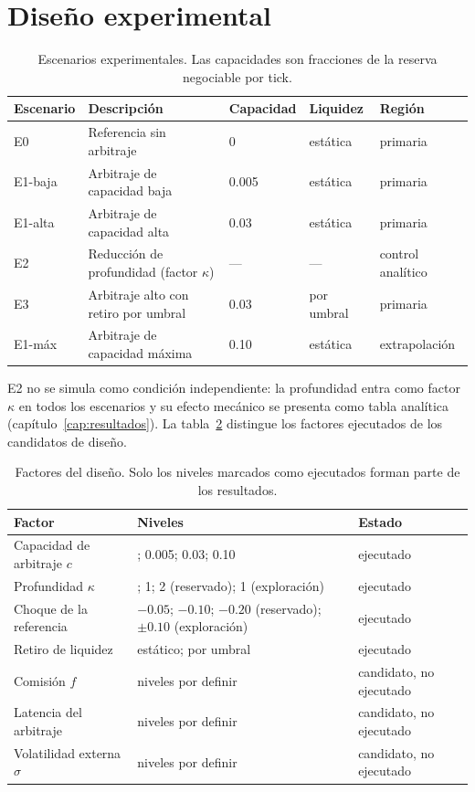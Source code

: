 \section{Diseño experimental}

\begin{table}[htbp]
\centering
\caption{Escenarios experimentales. Las capacidades son fracciones de la reserva negociable por tick.}
\label{tab:escenarios}
\small
\begin{tabularx}{\textwidth}{@{}l >{\raggedright\arraybackslash}X l l l@{}}
\toprule
Escenario & Descripción & Capacidad & Liquidez & Región \\
\midrule
E0 & Referencia sin arbitraje & 0 & estática & primaria \\
E1-baja & Arbitraje de capacidad baja & 0.005 & estática & primaria \\
E1-alta & Arbitraje de capacidad alta & 0.03 & estática & primaria \\
E2 & Reducción de profundidad (factor $\kappa$) & --- & --- & control analítico \\
E3 & Arbitraje alto con retiro por umbral & 0.03 & por umbral & primaria \\
E1-máx & Arbitraje de capacidad máxima & 0.10 & estática & extrapolación \\
\bottomrule
\end{tabularx}
\end{table}

E2 no se simula como condición independiente: la profundidad entra como factor $\kappa$ en todos los escenarios y su efecto mecánico se presenta como tabla analítica (capítulo~\ref{cap:resultados}). La tabla~\ref{tab:factores} distingue los factores ejecutados de los candidatos de diseño.

\begin{table}[htbp]
\centering
\caption{Factores del diseño. Solo los niveles marcados como ejecutados forman parte de los resultados.}
\label{tab:factores}
\scriptsize
\setlength{\tabcolsep}{3pt}
\renewcommand{\arraystretch}{0.9}
\begin{tabularx}{\textwidth}{@{}>{\raggedright\arraybackslash}p{} >{\raggedright\arraybackslash}X >{\raggedright\arraybackslash}p{}@{}}
\toprule
Factor & Niveles & Estado \\
\midrule
Capacidad de arbitraje $c$ & 0; 0.005; 0.03; 0.10 & ejecutado \\
Profundidad $\kappa$ & 0.5; 1; 2 (reservado); 1 (exploración) & ejecutado \\
Choque de la referencia & $-0.05$; $-0.10$; $-0.20$ (reservado); $\pm0.10$ (exploración) & ejecutado \\
Retiro de liquidez & estático; por umbral & ejecutado \\
Comisión $f$ & niveles por definir & candidato, no ejecutado \\
Latencia del arbitraje & niveles por definir & candidato, no ejecutado \\
Volatilidad externa $\sigma$ & niveles por definir & candidato, no ejecutado \\
\bottomrule
\end{tabularx}
\end{table}

